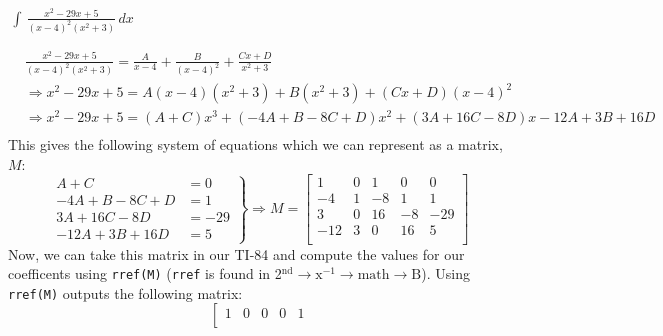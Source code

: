 \documentclass[addpoints]{exam}
\theoremstyle{definition}
\theoremstyle{plain}
\begin{document}
\begin{questions}
    \newpage

    \question $\displaystyle\,\int\,\frac{x^2-29x+5}{\left(x-4\right)^{2}\left(x^2+3\right)}\,dx$
    \begin{solution}[\stretch{1}]
        \begin{align*}
            & \frac{x^2-29x+5}{\left(x-4\right)^{2}\left(x^2+3\right)} = \frac{A}{x-4} + \frac{B}{\left(x-4\right)^{2}} + \frac{Cx + D}{x^2 + 3} \\
            &\Rightarrow {x^2} - 29x + 5 = A\left( {x - 4} \right)\left( {{x^2} + 3} \right) + B\left( {{x^2} + 3} \right) + \left( {Cx + D} \right){\left( {x - 4} \right)^2} \\
            &\Rightarrow {x^2} - 29x + 5 = \left( {A + C} \right){x^3} + \left( { - 4A + B - 8C + D} \right){x^2} + \left( {3A + 16C - 8D} \right)x - 12A + 3B + 16D \\
        \end{align*}
        This gives the following system of equations which we can represent as a matrix, $M$:
        \begin{equation*}
            \left.
            \begin{split}
                A + C &= 0 \\
                -4A + B - 8C + D &= 1 \\
                3A + 16C - 8D &= -29 \\
                -12A + 3B + 16D &= 5
            \end{split}
            \right\} \Rightarrow
            M = \left[ 
            \begin{array}{ccccc}
                1 & 0 & 1 & 0 & 0  \\
                -4 & 1 & -8 & 1 & 1  \\
                3 & 0 & 16 & -8 & -29  \\
                -12 & 3 & 0 & 16 & 5  \\
            \end{array} 
            \right]
        \end{equation*}
        Now, we can take this matrix in our TI-84 and compute the values for our coefficents using \texttt{rref(M)} (\texttt{rref} is found in 2$^{\text{nd}} \rightarrow \text{x}^{-1} \rightarrow \text{math} \rightarrow \text{B}$). Using \texttt{rref(M)} outputs the following matrix:
        \begin{equation*}
            \left[
            \begin{array}{ccccc}
                1 & 0 & 0 & 0 & 1  \\

\end{array}
\end{equation*}
\end{solution}
\end{questions}
\end{document}

